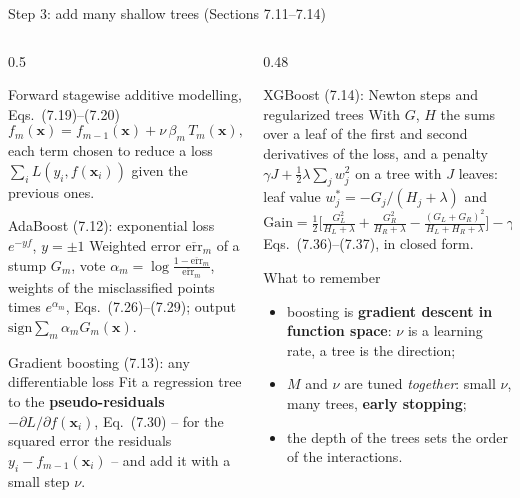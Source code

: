 \documentclass[10pt,aspectratio=169]{beamer}
\newcommand{\err}{\overline{\mathrm{err}}}
\newcommand{\sgn}{\mathrm{sign}}
\begin{document}
\begin{frame}{Step 3: add many shallow trees (Sections 7.11--7.14)}
\begin{columns}[T]
\begin{column}{0.5\textwidth}
\footnotesize
\begin{block}{Forward stagewise additive modelling, Eqs.\ (7.19)--(7.20)}
\[
f_m(\bm{x})=f_{m-1}(\bm{x})+\nu\,\beta_m\,T_m(\bm{x}),
\]
each term chosen to reduce a loss $\sum_iL(y_i,f(\bm{x}_i))$ given the
previous ones.
\end{block}
\begin{block}{AdaBoost (7.12): exponential loss $e^{-yf}$, $y=\pm1$}
Weighted error $\err_m$ of a stump $G_m$, vote
$\alpha_m=\log\frac{1-\err_m}{\err_m}$, weights of the misclassified points
times $e^{\alpha_m}$, Eqs.\ (7.26)--(7.29); output
$\sgn\sum_m\alpha_mG_m(\bm{x})$.
\end{block}
\begin{block}{Gradient boosting (7.13): any differentiable loss}
Fit a regression tree to the \textbf{pseudo-residuals}
$-\partial L/\partial f(\bm{x}_i)$, Eq.\ (7.30) -- for the squared error
the residuals $y_i-f_{m-1}(\bm{x}_i)$ -- and add it with a small step $\nu$.
\end{block}
\end{column}
\begin{column}{0.48\textwidth}
\footnotesize
\begin{block}{XGBoost (7.14): Newton steps and regularized trees}
With $G$, $H$ the sums over a leaf of the first and second derivatives of
the loss, and a penalty $\gamma J+\frac12\lambda\sum_jw_j^2$ on a tree with
$J$ leaves: leaf value $w_j^*=-G_j/(H_j+\lambda)$ and
\[
\mathrm{Gain}=\tfrac12\Big[\tfrac{G_L^2}{H_L+\lambda}+\tfrac{G_R^2}{H_R+\lambda}
-\tfrac{(G_L+G_R)^2}{H_L+H_R+\lambda}\Big]-\gamma ,
\]
Eqs.\ (7.36)--(7.37), in closed form.
\end{block}
\begin{block}{What to remember}
\begin{itemize}
  \item boosting is \textbf{gradient descent in function space}: $\nu$ is a
    learning rate, a tree is the direction;
  \item $M$ and $\nu$ are tuned \emph{together}: small $\nu$, many trees,
    \textbf{early stopping};
  \item the depth of the trees sets the order of the interactions.
\end{itemize}
\end{block}
\end{column}
\end{columns}
\end{frame}
\end{document}
